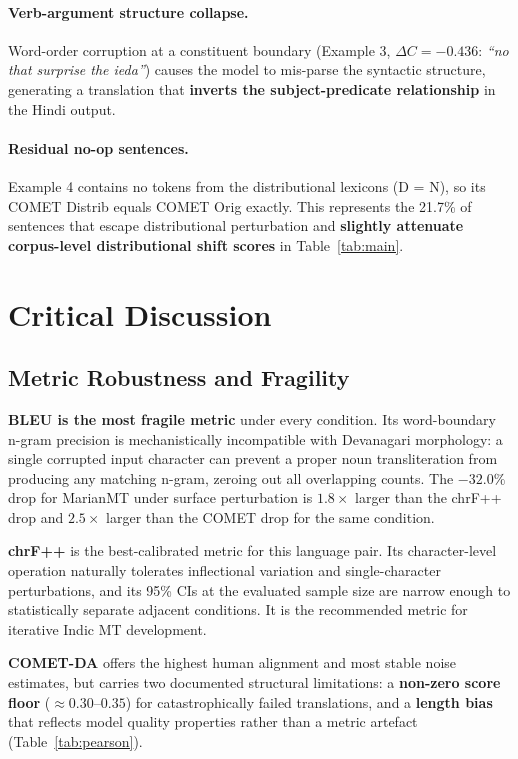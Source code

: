 \documentclass[11pt,a4paper]{article}
\begin{document}
\paragraph{Verb-argument structure collapse.}
Word-order corruption at a constituent boundary (Example 3, $\Delta C =
-0.436$: \emph{``no that surprise the ieda''}) causes the model to mis-parse
the syntactic structure, generating a translation that \textbf{inverts the
subject-predicate relationship} in the Hindi output.

\paragraph{Residual no-op sentences.}
Example 4 contains no tokens from the distributional lexicons (D = N), so its
COMET Distrib equals COMET Orig exactly. This represents the 21.7\% of
sentences that escape distributional perturbation and \textbf{slightly
attenuate corpus-level distributional shift scores} in Table~\ref{tab:main}.

\section{Critical Discussion}

\subsection{Metric Robustness and Fragility}

\textbf{BLEU is the most fragile metric} under every condition. Its
word-boundary n-gram precision is mechanistically incompatible with Devanagari
morphology: a single corrupted input character can prevent a proper noun
transliteration from producing any matching n-gram, zeroing out all overlapping
counts. The $-32.0\%$ drop for MarianMT under surface perturbation is $1.8\times$
larger than the chrF++ drop and $2.5\times$ larger than the COMET drop for
the same condition.

\textbf{chrF++} is the best-calibrated metric for this language pair.
Its character-level operation naturally tolerates inflectional variation and
single-character perturbations, and its 95\% CIs at the evaluated sample size
are narrow enough to statistically separate adjacent conditions. It is the
recommended metric for iterative Indic MT development.

\textbf{COMET-DA} offers the highest human alignment and most stable noise
estimates, but carries two documented structural limitations: a \textbf{non-zero
score floor} ($\approx 0.30$--$0.35$) for catastrophically failed translations,
and a \textbf{length bias} that reflects model quality properties rather than
a metric artefact (Table~\ref{tab:pearson}).
\end{document}
